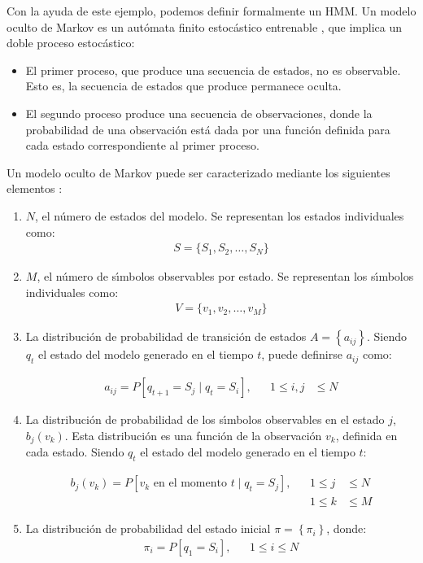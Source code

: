Con la ayuda de este ejemplo, podemos definir formalmente un HMM. Un modelo oculto de Markov es un 
aut\'omata finito estoc\'astico entrenable \cite{KouemouHistory2011}, que implica un doble proceso estoc\'astico:

\begin{itemize}
\item El primer proceso, que produce una secuencia de estados, no es observable. Esto es, la secuencia de estados 
que produce permanece oculta.
\item El segundo proceso produce una secuencia de observaciones, donde la probabilidad de 
una observaci\'on est\'a dada por una funci\'on definida para cada estado correspondiente al primer proceso.
\end{itemize}

Un modelo oculto de Markov puede ser caracterizado mediante los siguientes elementos \cite{Rabiner89atutorial}:

\begin{enumerate}
	\item $N$, el n\'umero de estados del modelo. Se representan los estados individuales como: 
		\begin{align}
			S=\{S_1,S_2,\ldots,S_N\}\label{eq:hmmS}
	\end{align}

	\item $M$, el n\'umero de s{\'\i}mbolos observables por estado. Se representan los s{\'\i}mbolos individuales 
		como: 
		\begin{align}
			V=\{v_1,v_2,\ldots,v_M\}\label{eq:hmmV}
	\end{align}

	\item La distribuci\'on de probabilidad de transici\'on de estados $A = \left\{a_{ij}\right\}$.
		Siendo $q_t$ el estado del modelo generado en el tiempo $t$, puede definirse $a_{ij}$ como:

		\begin{align}
			a_{ij} = P[q_{t+1} = S_j \mid q_t = S_i], & & 1 \leq i,j & \leq N\label{eq:hmmA}
		\end{align}

	\item La distribuci\'on de probabilidad de los s{\'\i}mbolos observables en el estado $j$, $b_j(v_k)$. 
		Esta distribuci\'on es una funci\'on de la observaci\'on $v_k$, definida en cada estado.
		Siendo $q_t$ el estado del modelo generado en el tiempo $t$:

		\begin{align}
			b_j(v_k) = P[v_k \text{ en el momento } t \mid q_t = S_j], & & 1 \leq j & \leq N \label{eq:hmmB}
			\\& & 1 \leq k & \leq M \nonumber
		\end{align}

	\item La distribuci\'on de probabilidad del estado inicial $\pi=\left\{\pi_i\right\}$, donde:
		\begin{align}
			\pi_i = P[q_1=S_i], & & 1 \leq i \leq N \label{eq:hmmPI}
		\end{align}
\end{enumerate}

